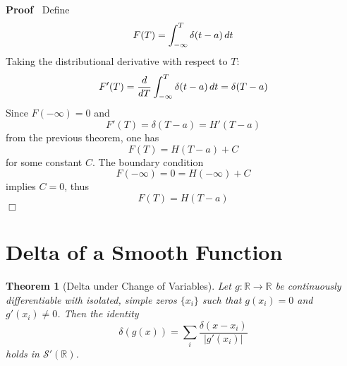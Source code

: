 \documentclass{article}
\newenvironment{proof}{\noindent\textbf{Proof\ }}{\hspace*{\fill}$\Box$\medskip}
\newtheorem{theorem}{Theorem}
\begin{document}
\begin{proof}
  Define
  \begin{equation}
    F (T) = \int_{- \infty}^T \delta (t - a)  \hspace{0.17em} dt
  \end{equation}
  Taking the distributional derivative with respect to $T$:
  \begin{equation}
    F' (T) = \frac{d}{dT}  \int_{- \infty}^T \delta (t - a)  \hspace{0.17em}
    dt = \delta (T - a)
  \end{equation}
  Since $F (- \infty) = 0$ and
  \begin{equation}
    F' (T) = \delta (T - a) = H'  (T - a)
  \end{equation}
  from the previous theorem, one has
  \begin{equation}
    F (T) = H (T - a) + C
  \end{equation}
  for some constant $C$. The boundary condition
  \begin{equation}
    F (- \infty) = 0 = H (- \infty) + C
  \end{equation}
  implies $C = 0$, thus
  \begin{equation}
    F (T) = H (T - a)
  \end{equation}
\end{proof}

\section{Delta of a Smooth Function}

\begin{theorem}
  [Delta under Change of Variables] Let $g : \mathbb{R} \to \mathbb{R}$ be
  continuously differentiable with isolated, simple zeros $\{x_i \}$ such that
  $g (x_i) = 0$ and $g' (x_i) \neq 0$. Then the identity
  \begin{equation}
    \delta (g (x)) = \sum_i \frac{\delta (x - x_i)}{|g' (x_i) |}
  \end{equation}
  holds in $\mathcal{S}' (\mathbb{R})$.
\end{theorem}
\end{document}
